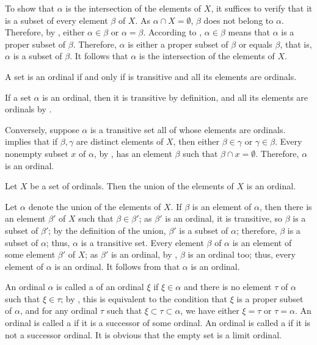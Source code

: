 \documentclass{article}
\begin{document}
To show that \(\alpha\) is the intersection of the elements of \(X\),
it suffices to verify that it is a subset of every element \(\beta\)
of \(X\).  As \(\alpha \cap X = \emptyset\), \(\beta\) does not belong
to \(\alpha\).  Therefore, by , either
\(\alpha \in \beta\) or \(\alpha = \beta\).  According to
, \(\alpha \in \beta\) means that \(\alpha\) is a
proper subset of \(\beta\).  Therefore, \(\alpha\) is either a proper
subset of \(\beta\) or equals \(\beta\), that is, \(\alpha\) is a
subset of \(\beta\).  It follows that \(\alpha\) is the intersection
of the elements of \(X\).

\begin{theorem}
  \label{thm:22wi7nhu}
  A set is an ordinal if and only if is transitive and all its
  elements are ordinals.
\end{theorem}

If a set \(\alpha\) is an ordinal, then it is transitive by
definition, and all its elements are ordinals by .

Conversely, suppose \(\alpha\) is a transitive set all of whose
elements are ordinals.   implies that if
\(\beta, \gamma\) are distinct elements of \(X\), then either
\(\beta \in \gamma\) or \(\gamma \in \beta\).  Every nonempty subset
\(x\) of \(\alpha\), by , has an element \(\beta\)
such that \(\beta \cap x = \emptyset\).  Therefore, \(\alpha\) is an
ordinal.

\begin{theorem}
  \label{thm:9s24zgf9}
  Let \(X\) be a set of ordinals.  Then the union of the elements of
  \(X\) is an ordinal.
\end{theorem}

Let \(\alpha\) denote the union of the elements of \(X\).  If
\(\beta\) is an element of \(\alpha\), then there is an element
\(\beta'\) of \(X\) such that \(\beta \in \beta'\); as \(\beta'\) is
an ordinal, it is transitive, so \(\beta\) is a subset of \(\beta'\);
by the definition of the union, \(\beta'\) is a subset of \(\alpha\);
therefore, \(\beta\) is a subset of \(\alpha\); thus, \(\alpha\) is a
transitive set.  Every element \(\beta\) of \(\alpha\) is an element
of some element \(\beta'\) of \(X\); as \(\beta'\) is an ordinal, by
, \(\beta\) is an ordinal too; thus, every element
of \(\alpha\) is an ordinal.  It follows from  that
\(\alpha\) is an ordinal.

An ordinal \(\alpha\) is called a  of an ordinal
\(\xi\) if \(\xi \in \alpha\) and there is no element \(\tau\) of
\(\alpha\) such that \(\xi \in \tau\); by , this is
equivalent to the condition that \(\xi\) is a proper subset of
\(\alpha\), and for any ordinal \(\tau\) such that
\(\xi \subset \tau \subset \alpha\), we have either \(\xi = \tau\) or
\(\tau = \alpha\).  An ordinal is called a  if it is a successor of some ordinal.  An ordinal is called
a  if it is not a successor ordinal.  It is
obvious that the empty set is a limit ordinal.
\end{document}
